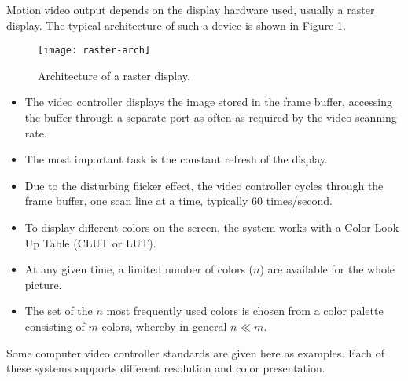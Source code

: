 Motion video output depends on the display hardware used, usually a raster display. The typical architecture of such a device is shown in Figure {\ref{fig:raster-arch}}.


\begin{figure}[H]
	\centering
	\texttt{[image: raster-arch]}
	\caption{Architecture of a raster display.}{\label{fig:raster-arch}}
\end{figure}

\begin{itemize}
	\item The video controller displays the image stored in the frame buffer, accessing the buffer through a separate port as often as required by the video scanning rate. 
	\item The most important task is the constant refresh of the display. 
	\item Due to the disturbing flicker effect, the video controller cycles through the frame buffer, one scan line at a time, typically 60 times/second. 
	\item To display different colors on the screen, the system works with a Color Look-Up Table (CLUT or LUT). 
	\item At any given time, a limited number of colors ($ n $) are available for the whole picture. 
	\item The set of the $ n $ most frequently used colors is chosen from a color palette consisting of $ m $ colors, whereby in general  $n \ll m$.
\end{itemize}


Some computer video controller standards are given here as examples. Each of these systems supports different resolution and color presentation.

